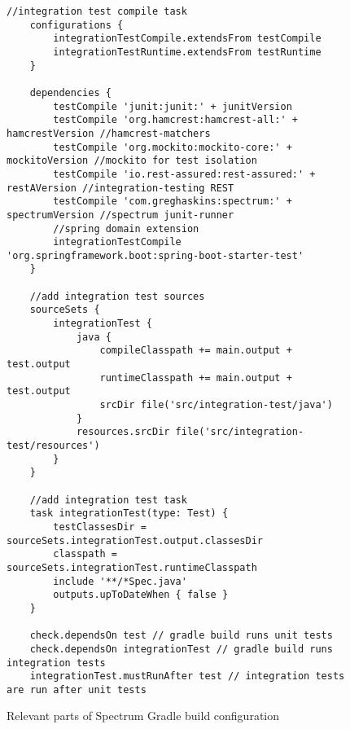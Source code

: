 \begin{figure}[H]
    \begin{lstlisting}[style=java]
    //integration test compile task
    configurations {
        integrationTestCompile.extendsFrom testCompile
        integrationTestRuntime.extendsFrom testRuntime
    }

    dependencies {
        testCompile 'junit:junit:' + junitVersion
        testCompile 'org.hamcrest:hamcrest-all:' + hamcrestVersion //hamcrest-matchers
        testCompile 'org.mockito:mockito-core:' + mockitoVersion //mockito for test isolation
        testCompile 'io.rest-assured:rest-assured:' + restAVersion //integration-testing REST
        testCompile 'com.greghaskins:spectrum:' + spectrumVersion //spectrum junit-runner
        //spring domain extension
        integrationTestCompile 'org.springframework.boot:spring-boot-starter-test'
    }

    //add integration test sources
    sourceSets {
        integrationTest {
            java {
                compileClasspath += main.output + test.output
                runtimeClasspath += main.output + test.output
                srcDir file('src/integration-test/java')
            }
            resources.srcDir file('src/integration-test/resources')
        }
    }

    //add integration test task
    task integrationTest(type: Test) {
        testClassesDir = sourceSets.integrationTest.output.classesDir
        classpath = sourceSets.integrationTest.runtimeClasspath
        include '**/*Spec.java'
        outputs.upToDateWhen { false }
    }

    check.dependsOn test // gradle build runs unit tests
    check.dependsOn integrationTest // gradle build runs integration tests
    integrationTest.mustRunAfter test // integration tests are run after unit tests
    \end{lstlisting}
    \caption{Relevant parts of Spectrum Gradle build configuration}
    \label{fig:spectrum-build}
\end{figure}

